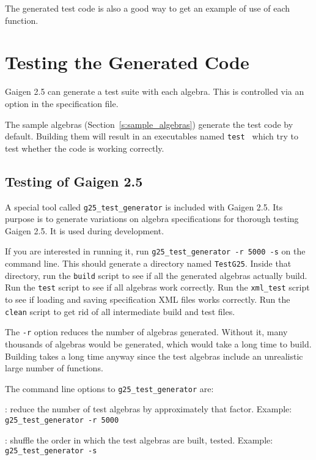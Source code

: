 \documentclass[10pt, a4paper]{article}
\begin{document}
The generated test code is also a good way to get an example
of use of each function.

\section{Testing the Generated Code}

Gaigen 2.5 can generate a test suite with each algebra.
This is controlled via an option in the specification file.

The sample algebras (Section~\ref{s:sample_algebras}) generate the test 
code by default. Building them will result in an executables named 
{\tt test } which try to test whether the code is working correctly. 


\subsection{Testing of Gaigen 2.5}

A special tool called {\tt g25\_test\_generator} is included with Gaigen 2.5.
Its purpose is to generate variations on algebra specifications for thorough testing
Gaigen 2.5. It is used during development.

If you are interested in running it, run {\tt g25\_test\_generator -r 5000 -s} on
the command line.
This should generate a directory named {\tt TestG25}. 
Inside that directory, run the {\tt build} script to see if all the
generated algebras actually build. Run the {\tt test} script to see if
all algebras work correctly. Run the {\tt xml\_test} script to see if
loading and saving specification XML files works correctly.
Run the {\tt clean} script to get rid of all intermediate build and test
files.

The {\tt -r} option reduces the number of algebras generated. Without it,
many thousands of algebras would be generated, which would take a long time to build.
Building takes a long time anyway since the test algebras include an unrealistic
large number of functions.

The command line options to {\tt g25\_test\_generator} are:
\vspace*{2mm}

: reduce the number of test algebras by approximately that factor.
Example: {\tt g25\_test\_generator -r 5000}

\vspace*{2mm}

: shuffle the order in which the test algebras are built, tested.
Example: {\tt g25\_test\_generator -s}
\end{document}
